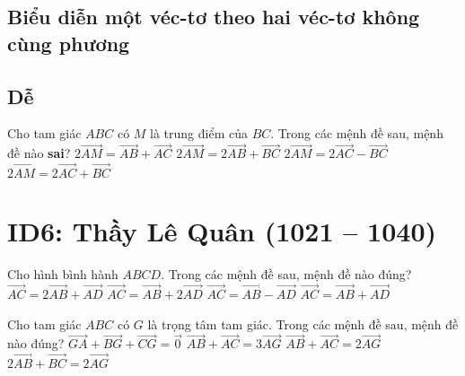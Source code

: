 \subsection{Biểu diễn một véc-tơ theo hai véc-tơ không cùng phương}
\subsection*{Dễ}
\begin{ex}%
	Cho tam giác $ABC$ có $M$ là trung điểm của $BC$. Trong các mệnh đề sau, mệnh đề nào \textbf{sai}?
	\choice
	{$2\vec{AM}=\vec{AB}+\vec{AC}$}
	{$2\vec{AM}=2\vec{AB}+\vec{BC}$}
	{$2\vec{AM}=2\vec{AC}-\vec{BC}$}
	{\True $2\vec{AM}=2\vec{AC}+\vec{BC}$}
\end{ex} 



\section*{ID6: Thầy Lê Quân (1021 -- 1040)}
\begin{ex}%
	Cho hình bình hành $ABCD$. Trong các mệnh đề sau, mệnh đề nào đúng?
	\haicot
	{$\vec{AC}=2\vec{AB}+\vec{AD}$}
	{$\vec{AC}=\vec{AB}+2\vec{AD}$}
	{$\vec{AC}=\vec{AB}-\vec{AD}$}
	{\True $\vec{AC}=\vec{AB}+\vec{AD}$}
\end{ex}

\begin{ex}%
	Cho tam giác $ABC$ có $G$ là trọng tâm tam giác. Trong các mệnh đề sau, mệnh đề nào đúng?
	\choice
	{$\vec{GA}+\vec{BG}+\vec{CG}=\vec{0}$}
	{\True $\vec{AB}+\vec{AC}=3\vec{AG}$}
	{$\vec{AB}+\vec{AC}=2\vec{AG}$}
	{$2\vec{AB}+\vec{BC}=2\vec{AG}$}
\end{ex}

